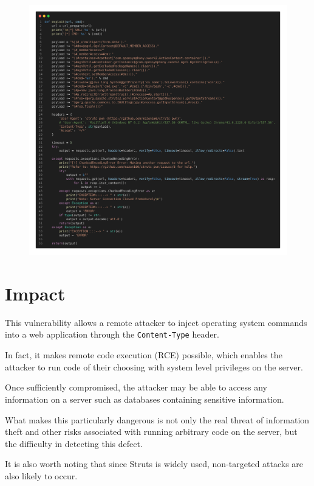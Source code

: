 \documentclass[a4paper, 11pt]{article}
\begin{document}
\begin{figure}[H]
    \centering
    \includegraphics[width=\textwidth]{img/exploit.png}
\end{figure}

\pagebreak

\section{Impact}

This vulnerability allows a remote attacker to inject operating system commands into a web application
through the \texttt{Content-Type} header.

In fact, it makes remote code execution (RCE) possible, which enables the attacker to run code of their
choosing with system level privileges on the server.

Once sufficiently compromised, the attacker may be able to access any information on a server such as
databases containing sensitive information.

What makes this particularly dangerous is not only the real threat of information theft and other risks
associated with running arbitrary code on the server, but the difficulty in detecting this defect.

It is also worth noting that since Struts is widely used, non-targeted attacks are also likely to occur.
\end{document}
